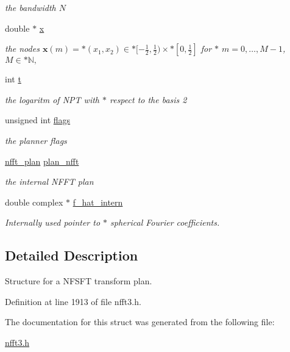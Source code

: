 \begin{CompactItemize}
\begin{CompactList}\small\item\em the bandwidth $N$ \item\end{CompactList}\item 
\hypertarget{structnfsft__plan_o5}{
double $\ast$ \hyperlink{structnfsft__plan_o5}{x}}
\label{structnfsft__plan_o5}

\begin{CompactList}\small\item\em the nodes $\mathbf{x}(m) = * \left(x_1,x_2\right) \in * [-\frac{1}{2},\frac{1}{2}) \times * [0,\frac{1}{2}]$ for $\ast$ $m=0,\ldots,M-1$,$M \in * \mathbb{N},$ \item\end{CompactList}\item 
\hypertarget{structnfsft__plan_o6}{
int \hyperlink{structnfsft__plan_o6}{t}}
\label{structnfsft__plan_o6}

\begin{CompactList}\small\item\em the logaritm of NPT with $\ast$ respect to the basis 2 \item\end{CompactList}\item 
\hypertarget{structnfsft__plan_o7}{
unsigned int \hyperlink{structnfsft__plan_o7}{flags}}
\label{structnfsft__plan_o7}

\begin{CompactList}\small\item\em the planner flags \item\end{CompactList}\item 
\hypertarget{structnfsft__plan_o8}{
\hyperlink{structnfft__plan}{nfft\_\-plan} \hyperlink{structnfsft__plan_o8}{plan\_\-nfft}}
\label{structnfsft__plan_o8}

\begin{CompactList}\small\item\em the internal NFFT plan \item\end{CompactList}\item 
\hypertarget{structnfsft__plan_o9}{
double complex $\ast$ \hyperlink{structnfsft__plan_o9}{f\_\-hat\_\-intern}}
\label{structnfsft__plan_o9}

\begin{CompactList}\small\item\em Internally used pointer to $\ast$ spherical Fourier coefficients. \item\end{CompactList}\end{CompactItemize}


\subsection{Detailed Description}
Structure for a NFSFT transform plan. 



Definition at line 1913 of file nfft3.h.

The documentation for this struct was generated from the following file:\begin{CompactItemize}
\item 
\hyperlink{nfft3_8h}{nfft3.h}\end{CompactItemize}
